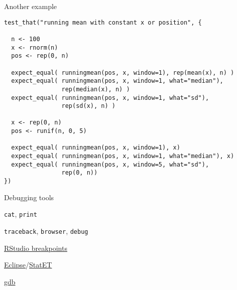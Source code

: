 \documentclass[aspectratio=169,12pt,t]{beamer}
\begin{document}
\begin{frame}[c,fragile]{Another example}

\begin{lstlisting}
test_that("running mean with constant x or position", {

  n <- 100
  x <- rnorm(n)
  pos <- rep(0, n)

  expect_equal( runningmean(pos, x, window=1), rep(mean(x), n) )
  expect_equal( runningmean(pos, x, window=1, what="median"),
                rep(median(x), n) )
  expect_equal( runningmean(pos, x, window=1, what="sd"),
                rep(sd(x), n) )

  x <- rep(0, n)
  pos <- runif(n, 0, 5)

  expect_equal( runningmean(pos, x, window=1), x)
  expect_equal( runningmean(pos, x, window=1, what="median"), x)
  expect_equal( runningmean(pos, x, window=5, what="sd"),
                rep(0, n))
})
\end{lstlisting}

\end{frame}


\begin{frame}{Debugging tools}


\bbi
\item {\tt cat}, {\tt print}
\item {\tt traceback}, {\tt browser}, {\tt debug}
\item \href{http://www.rstudio.com/ide/docs/debugging/overview}{RStudio breakpoints}
\item \href{http://www.eclipse.org/eclipse}{Eclipse}/\href{http://www.walware.de/goto/statet}{StatET}
\item \href{http://www.sourceware.org/gdb/}{gdb}
\ei

\end{frame}
\end{document}

